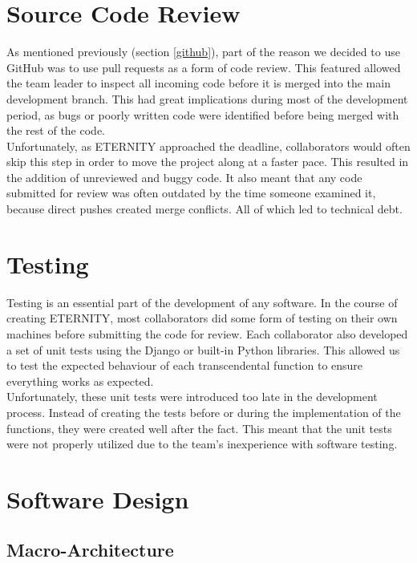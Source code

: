 \documentclass[11pt,onside]{report}
\begin{document}
\section{Source Code Review}

As mentioned previously (section \ref{github}), part of the reason we decided to use GitHub was to use pull requests as a form of code review. This featured allowed the team leader to inspect all incoming code before it is merged into the main development branch. This had great implications during most of the development period, as bugs or poorly written code were identified before being merged with the rest of the code.  \\

Unfortunately, as ETERNITY approached the deadline, collaborators would often skip this step in order to move the project along at a faster pace. This resulted in the addition of unreviewed and buggy code. It also meant that any code submitted for review was often outdated by the time someone examined it, because direct pushes created merge conflicts. All of which led to technical debt. \cite{technical-debt}

\section{Testing}

Testing is an essential part of the development of any software. In the course of creating ETERNITY, most collaborators did some form of testing on their own machines before submitting the code for review. Each collaborator also developed a set of unit tests using the Django or built-in Python libraries. This allowed us to test the expected behaviour of each transcendental function to ensure everything works as expected. \\

Unfortunately, these unit tests were introduced too late in the development process. Instead of creating the tests before or during the implementation of the functions, they were created well after the fact. This meant that the unit tests were not properly utilized due to the team's inexperience with software testing.

\section{Software Design}

\subsection{Macro-Architecture}
\end{document}
